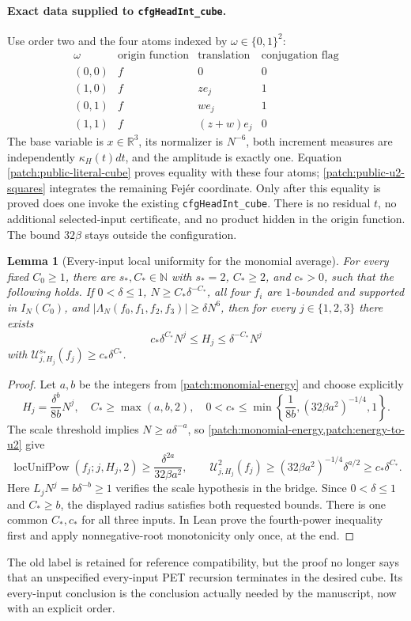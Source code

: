 \documentclass[11pt]{article}
\newtheorem{lemma}[lemma]{Lemma}
\theoremstyle{definition}
\newcommand{\pid}[1]{\nolinkurl{#1}}
\begin{document}
\paragraph{Exact data supplied to \texttt{cfgHeadInt\_cube}.}
Use order two and the four atoms indexed by $\omega\in\{0,1\}^2$:
\[
 \begin{array}{c|c|c|c}
 \omega &\text{origin function}&\text{translation}&\text{conjugation flag}\\\hline
 (0,0)&f&0&0\\
 (1,0)&f&ze_j&1\\
 (0,1)&f&we_j&1\\
 (1,1)&f&(z+w)e_j&0
 \end{array}
\]
The base variable is $x\in\mathbb R^3$, its normalizer is $N^{-6}$, both increment measures
are independently $\kappa_H(t)dt$, and the amplitude is exactly one.
Equation \eqref{patch:public-literal-cube} proves equality with these four atoms;
\eqref{patch:public-u2-squares} integrates the remaining Fej\'er coordinate.
Only after this equality is proved does one invoke the existing \pid{cfgHeadInt_cube}.
There is no residual $t$, no additional selected-input certificate, and no product hidden
in the origin function.  The bound $32\beta$ stays outside the configuration.

\begin{lemma}[Every-input local uniformity for the monomial average]
\label{lem:pet-reduction}
For every fixed $C_0\geq1$, there are $s_*,C_*\in\mathbb N$ with $s_*=2$, $C_*\geq2$,
and $c_*>0$, such that the following holds.  If $0<\delta\leq1$, $N\geq C_*\delta^{-C_*}$,
all four $f_i$ are $1$-bounded and supported in $I_N(C_0)$, and
$|\Lambda_N(f_0,f_1,f_2,f_3)|\geq\delta N^6$, then for every $j\in\{1,2,3\}$ there exists
\[
 c_*\delta^{C_*}N^j\leq H_j\leq\delta^{-C_*}N^j
\]
with $\mathcal U^{s_*}_{j,H_j}(f_j)\geq c_*\delta^{C_*}$.
\end{lemma}
\begin{proof}
Let $a,b$ be the integers from \cref{patch:monomial-energy} and choose explicitly
\[
 H_j=\frac{\delta^b}{8b}N^j,
 \quad C_*\geq\max(a,b,2),
 \quad0<c_*\leq\min\left\{\frac1{8b},(32\beta a^2)^{-1/4},1\right\}.
\]
The scale threshold implies $N\geq a\delta^{-a}$, so
\cref{patch:monomial-energy,patch:energy-to-u2} give
\[
 \operatorname{locUnifPow}(f_j;j,H_j,2)
       \geq\frac{\delta^{2a}}{32\beta a^2},\qquad
 \mathcal U^2_{j,H_j}(f_j)
       \geq(32\beta a^2)^{-1/4}\delta^{a/2}
       \geq c_*\delta^{C_*}.
\]
Here $L_jN^j=b\delta^{-b}\geq1$ verifies the scale hypothesis in the bridge.
Since $0<\delta\leq1$ and $C_*\geq b$, the displayed radius satisfies both requested
bounds.  There is one common $C_*,c_*$ for all three inputs.
In Lean prove the fourth-power inequality first and apply nonnegative-root monotonicity
only once, at the end.
\end{proof}
The old label is retained for reference compatibility, but the proof no longer says that an
unspecified every-input PET recursion terminates in the desired cube.  Its every-input
conclusion is the conclusion actually needed by the manuscript, now with an explicit order.
\end{document}
